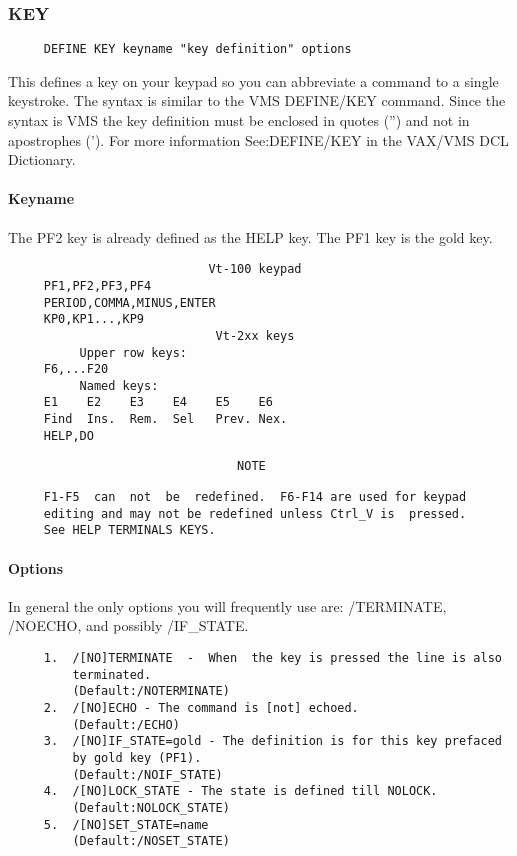 \subsubsection{KEY}
\begin{verbatim}
     DEFINE KEY keyname "key definition" options 
\end{verbatim}

This  defines a key on your keypad so you can abbreviate a command to a
single keystroke.  The syntax is similar to the VMS DEFINE/KEY command.
Since  the  syntax is VMS the key definition must be enclosed in quotes
('') and not in apostrophes (').  For more information See:DEFINE/KEY in
the VAX/VMS DCL Dictionary.  
\paragraph{Keyname}
The PF2 key is already defined as the HELP key.  
The PF1 key is the gold key.  

\begin{verbatim}
                            Vt-100 keypad
     PF1,PF2,PF3,PF4 
     PERIOD,COMMA,MINUS,ENTER 
     KP0,KP1...,KP9 
                             Vt-2xx keys
          Upper row keys:  
     F6,...F20 
          Named keys:  
     E1    E2    E3    E4    E5    E6 
     Find  Ins.  Rem.  Sel   Prev. Nex.  
     HELP,DO 
\end{verbatim}


\begin{verbatim}
                                NOTE
\end{verbatim}

\begin{verbatim}
     F1-F5  can  not  be  redefined.  F6-F14 are used for keypad
     editing and may not be redefined unless Ctrl_V is  pressed.
     See HELP TERMINALS KEYS.  
\end{verbatim}


\paragraph{Options}
In general the only options you will frequently use are:  /TERMINATE,
/NOECHO, and possibly /IF\_STATE.  
\begin{verbatim}
     1.  /[NO]TERMINATE  -  When  the key is pressed the line is also
         terminated.  
         (Default:/NOTERMINATE) 
     2.  /[NO]ECHO - The command is [not] echoed.  
         (Default:/ECHO) 
     3.  /[NO]IF_STATE=gold - The definition is for this key prefaced
         by gold key (PF1).  
         (Default:/NOIF_STATE) 
     4.  /[NO]LOCK_STATE - The state is defined till NOLOCK.  
         (Default:NOLOCK_STATE) 
     5.  /[NO]SET_STATE=name 
         (Default:/NOSET_STATE) 
\end{verbatim}
